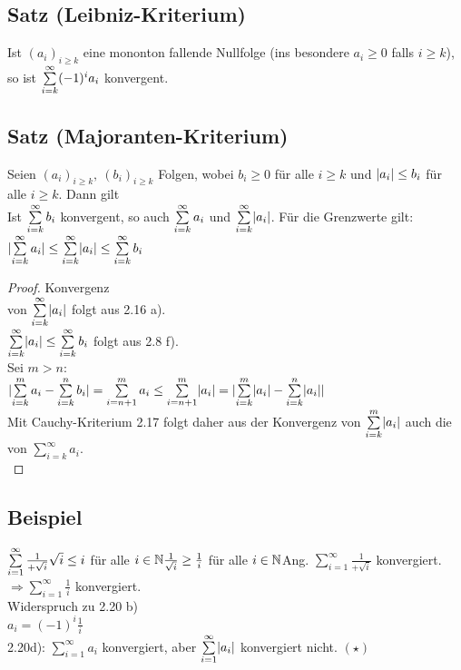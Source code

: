 \subsection{Satz (Leibniz-Kriterium)}
Ist $(a_i)_{i \geq k}$ eine mononton fallende Nullfolge (ins besondere $a_i \geq 0$ falls $i \geq k$), so ist $\sum\limits_{i=k}^{\infty} (-1)^i a_i$ konvergent.
\subsection{Satz (Majoranten-Kriterium)}
Seien $(a_i)_{i \geq k}, \ (b_i)_{i \geq k}$ Folgen, wobei $b_i \geq 0$ für alle $i \geq k$ und $\lvert a_i \rvert \leq b_i$ für alle $i \geq k$. Dann gilt\\
Ist $\sum\limits_{i=k}^{\infty} b_i$ konvergent, so auch $\sum\limits_{i=k}^{\infty} a_i$ und $\sum\limits_{i=k}^{\infty} \lvert a_i \rvert$. Für die Grenzwerte gilt:\\
$\lvert \sum\limits_{i=k}^{\infty} a_i \rvert \leq \sum\limits_{i=k}^{\infty} \lvert a_i \rvert \leq \sum\limits_{i=k}^{\infty} b_i$
\begin{proof}
Konvergenz\\
von $\sum\limits_{i=k}^{\infty} \lvert a_i \rvert$ folgt aus 2.16 a).\\
$\sum\limits_{i=k}^{\infty} \lvert a_i \rvert \leq \sum\limits_{i=k}^{\infty} b_i$ folgt aus 2.8 f).\\
Sei $m > n$:\\
$\lvert \sum\limits_{i = k}^{m} a_i - \sum\limits_{i=k}^{n} b_i \rvert = \sum\limits_{i = n+ 1}^{m} a_i \leq \sum\limits_{i = n+1}^{m} \lvert a_i \rvert = \lvert \sum\limits_{i=k}^{m} \lvert a_i \rvert-\sum\limits_{i=k}^{n} \lvert a_i \rvert \rvert$\\
Mit Cauchy-Kriterium 2.17 folgt daher aus der Konvergenz von $\sum\limits_{i=k}^{m} \lvert a_i \rvert$ auch die von $\sum\limits_{i=k}^{\infty} a_i$.\\
\end{proof}
\subsection{Beispiel}
$\sum\limits_{i=1}^{\infty} \frac{1}{+\sqrt{i}}
\\\sqrt{i} \leq i$ für alle $i \in \mathbb{N}\\
\frac{1}{\sqrt{i}} \geq \frac{1}{i}$ für alle $i \in \mathbb{N}\\
$Ang. $\sum\limits_{i=1}^{\infty} \frac{1}{+\sqrt{i}}$ konvergiert.
$\Rightarrow \sum\limits_{i=1}^{\infty} \frac{1}{i}$ konvergiert.\\
Widerspruch zu 2.20 b)
\bigskip\\
$a_i = (-1)^i \frac{1}{i}$\\
2.20d): $\sum\limits_{i=1}^{\infty} a_i$ konvergiert,
aber $\sum\limits_{i=1}^{\infty} \lvert a_i \rvert$ konvergiert nicht. $(\star)$
